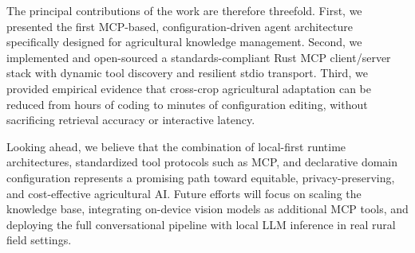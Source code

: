 \documentclass[11pt,a4paper]{article}
\begin{document}
The principal contributions of the work are therefore threefold. First, we presented the first MCP-based, configuration-driven agent architecture specifically designed for agricultural knowledge management. Second, we implemented and open-sourced a standards-compliant Rust MCP client/server stack with dynamic tool discovery and resilient stdio transport. Third, we provided empirical evidence that cross-crop agricultural adaptation can be reduced from hours of coding to minutes of configuration editing, without sacrificing retrieval accuracy or interactive latency.

Looking ahead, we believe that the combination of local-first runtime architectures, standardized tool protocols such as MCP, and declarative domain configuration represents a promising path toward equitable, privacy-preserving, and cost-effective agricultural AI. Future efforts will focus on scaling the knowledge base, integrating on-device vision models as additional MCP tools, and deploying the full conversational pipeline with local LLM inference in real rural field settings.
\end{document}
